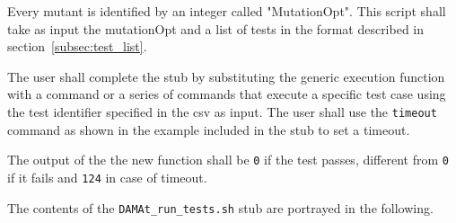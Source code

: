 Every mutant is identified by an integer called "MutationOpt".
This script shall take as input the mutationOpt and a list of tests in the format described in section~\ref{subsec:test_list}.

The user shall complete the stub by substituting the generic execution function with a command or a series of commands that execute a specific test case using the test identifier specified in the csv as input.
The user shall use the \texttt{timeout} command as shown in the example included in the stub to set a timeout.

The output of the the new function shall be \texttt{0} if the test passes, different from \texttt{0} if it fails and \texttt{124} in case of timeout.

The contents of the \texttt{DAMAt\_run\_tests.sh} stub are portrayed in the following.

